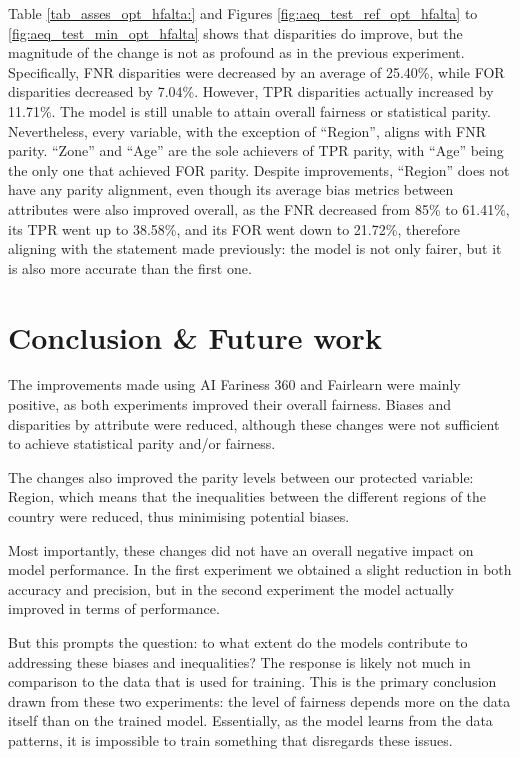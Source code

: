 \documentclass[fleqn,10pt]{wlscirep}
\begin{document}
 Table \ref{tab_asses_opt_hfalta:} and Figures \ref{fig:aeq_test_ref_opt_hfalta} to \ref{fig:aeq_test_min_opt_hfalta} shows that disparities do improve, but the magnitude of the change is not as profound as in the previous experiment. Specifically, FNR disparities were decreased by an average of 25.40\%, while FOR disparities decreased by 7.04\%. However, TPR disparities actually increased by 11.71\%. The model is still unable to attain overall fairness or statistical parity. Nevertheless, every variable, with the exception of ``Region'', aligns with FNR parity. ``Zone'' and ``Age'' are the sole achievers of TPR parity, with ``Age'' being the only one that achieved FOR parity. Despite improvements, ``Region'' does not have any parity alignment, even though its average bias metrics between attributes were also improved overall, as the FNR decreased from 85\% to 61.41\%, its TPR went up to 38.58\%, and its FOR went down to 21.72\%, therefore aligning with the statement made previously: the model is not only fairer, but it is also more accurate than the first one.





\section{Conclusion \& Future work}
\label{conclusion}

The improvements made using AI Fariness 360 and Fairlearn were mainly positive, as both experiments improved their overall fairness. Biases and disparities by attribute were reduced, although these changes were not sufficient to achieve statistical parity and/or fairness.

The changes also improved the parity levels between our protected variable: Region, which means that the inequalities between the different regions of the country were reduced, thus minimising potential biases. 

Most importantly, these changes did not have an overall negative impact on model performance. In the first experiment we obtained a slight reduction in both accuracy and precision, but in the second experiment the model actually improved in terms of performance.

But this prompts the question: to what extent do the models contribute to addressing these biases and inequalities? The response is likely not much in comparison to the data that is used for training. This is the primary conclusion drawn from these two experiments: the level of fairness depends more on the data itself than on the trained model. Essentially, as the model learns from the data patterns, it is impossible to train something that disregards these issues.
\end{document}
